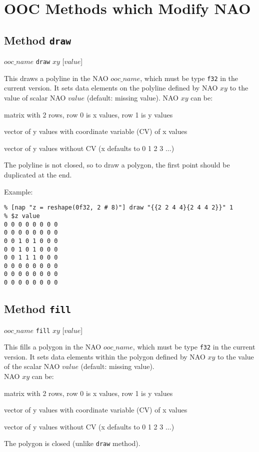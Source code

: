 
\section{OOC Methods which Modify NAO}

\subsection{Method \texttt{draw}}
    \label{ooc-modify-draw}

$ooc\_name$ \texttt{draw} $xy$ [$value$]

This draws a polyline in the NAO 
  $ooc\_name$, which must be type 
  \texttt{f32} in the current version. It sets data elements on the
  polyline defined by NAO 
  $xy$ to the value of scalar NAO 
  $value$ (default: missing value). NAO 
  $xy$ can be:
\begin{bullets}
    \item matrix with 2 rows, row 0 is x values, row 1 is y values
    \item vector of y values with coordinate variable (CV) of x
    values
    \item vector of y values without CV (x defaults to 0 1 2 3 $\ldots$)
\end{bullets}
The polyline is not closed, so to draw a polygon, the first point should be duplicated at the end.

Example:
\begin{verbatim}
% [nap "z = reshape(0f32, 2 # 8)"] draw "{{2 2 4 4}{2 4 4 2}}" 1
% $z value
0 0 0 0 0 0 0 0
0 0 0 0 0 0 0 0
0 0 1 0 1 0 0 0
0 0 1 0 1 0 0 0
0 0 1 1 1 0 0 0
0 0 0 0 0 0 0 0
0 0 0 0 0 0 0 0
0 0 0 0 0 0 0 0
\end{verbatim}

\subsection{Method \texttt{fill}}
    \label{ooc-modify-fill}

$ooc\_name$ \texttt{fill} $xy$ [$value$]

This fills a polygon in the NAO 
  $ooc\_name$, which must be type 
  \texttt{f32} in the current version. It sets data elements within
  the polygon defined by NAO 
  $xy$ to the value of the scalar NAO 
  $value$ (default: missing value).
  \\NAO 
  $xy$ can be:
\begin{bullets}
    \item matrix with 2 rows, row 0 is x values, row 1 is y values
    \item vector of y values with coordinate variable (CV) of x
    values
    \item vector of y values without CV (x defaults to 0 1 2 3 $\ldots$)
\end{bullets}
The polygon is closed (unlike \texttt{draw} method).


